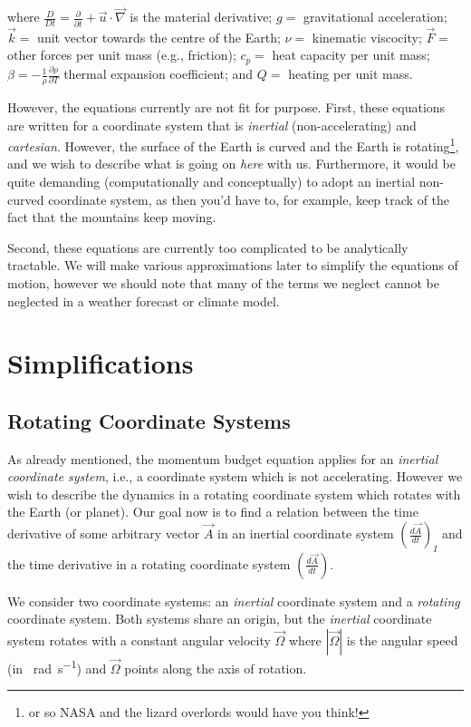 \noindent where $\frac{D}{Dt}=\frac{\partial}{\partial t}+\vec{u}\cdot\vec{\nabla}$ is the material derivative; $g=$ gravitational acceleration; $\vec{k}=$ unit vector towards the centre of the Earth; $\nu=$ kinematic viscocity; $\vec{F}=$ other forces per unit mass (e.g., friction); $c_p=$ heat capacity per unit mass; $\beta=-\frac{1}{\rho}\frac{\partial \rho}{\partial T}$ thermal expansion coefficient; and $Q=$ heating per unit mass.

However, the equations currently are not fit for purpose. First, these equations are written for a coordinate system that is \textit{inertial} (non-accelerating) and \textit{cartesian}. However, the surface of the Earth is curved and the Earth is rotating\footnote{or so NASA and the lizard overlords would have you think!}, and we wish to describe what is going on \textit{here} with us. Furthermore, it would be quite demanding (computationally and conceptually) to adopt an inertial non-curved coordinate system, as then you'd have to, for example, keep track of the fact that the mountains keep moving. 

Second, these equations are currently too complicated to be analytically tractable. We will make various approximations later to simplify the equations of motion, however we should note that many of the terms we neglect cannot be neglected in a weather forecast or climate model.

\section{Simplifications}

\subsection{Rotating Coordinate Systems}

As already mentioned, the momentum budget equation applies for an \textit{inertial coordinate system}, i.e., a coordinate system which is not accelerating. However we wish to describe the dynamics in a rotating coordinate system which rotates with the Earth (or planet). Our goal now is to  find a relation between the time derivative of some arbitrary vector $\vec{A}$ in an inertial coordinate system $\left(\frac{d\vec{A}}{dt}\right)_I$ and the time derivative in a rotating coordinate system $\left(\frac{d\vec{A}}{dt}\right)$.

We consider two coordinate systems: an \textit{inertial} coordinate system and a \textit{rotating} coordinate system. Both systems share an origin, but the \textit{inertial} coordinate system rotates with a constant angular velocity $\vec{\Omega}$ where $|\vec{\Omega}|$ is the angular speed (in \qty{}{\radian\per\second}) and $\vec{\Omega}$ points along the axis of rotation.

